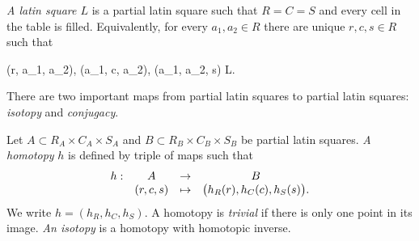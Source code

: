 \begin{defn}
\emph{A latin square $L$} is a partial latin square such that $R=C=S$ and every cell in the table is filled. Equivalently, for every $a_1, a_2 \in R$ there are unique $r,c,s \in R$ such that
\begin{cosyeqnarray}
	(r, a_1, a_2), (a_1, c, a_2), (a_1, a_2, s) \in L.
\end{cosyeqnarray}
\end{defn}

There are two important maps from partial latin squares to partial latin squares: \emph{isotopy} and \emph{conjugacy}.

\begin{defn}
\label{defn:homotopy}
Let $A \subset R_A \times C_A \times S_A$ and $B \subset R_B \times C_B \times S_B$ be partial latin squares. \emph{A homotopy} $h$ is defined by triple of maps
%
such that 
$$\begin{array}{ c c c c }
h: &	A & \rightarrow & B \\
	&	(r,c,s) & \mapsto & \big(h_R(r), h_C(c), h_S(s)\big).
\end{array}$$
We write $h = (h_R, h_C, h_S)$. A homotopy is \emph{trivial} if there is only one point in its image. \emph{An isotopy} is a homotopy with homotopic inverse.
\end{defn}

